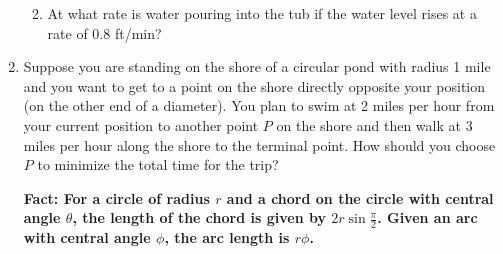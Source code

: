 \documentclass[11pt,letterpaper]{article}
\begin{document}
\begin{enumerate}
\begin{enumerate}
\vspace{20pc}
\item At what rate is water pouring into the tub if the water level rises at a rate of 0.8 ft/min?
\end{enumerate}

\newpage
\item Suppose you are standing on the shore of a circular pond with radius 1 mile and you want to get to a point on the shore directly opposite your position (on the other end of a diameter).  You plan to swim at 2 miles per hour from your current position to another point $P$ on the shore and then walk at 3 miles per hour along the shore to the terminal point.  How should you choose $P$ to minimize the total time for the trip?

{\bf Fact: For a circle of radius $r$ and a chord on the circle with central angle $\theta$, the length of the chord is given by $2r\sin\frac{\pi}{2}$.  Given an arc with central angle $\phi$, the arc length is $r\phi$. }

\end{enumerate}
\end{document}
